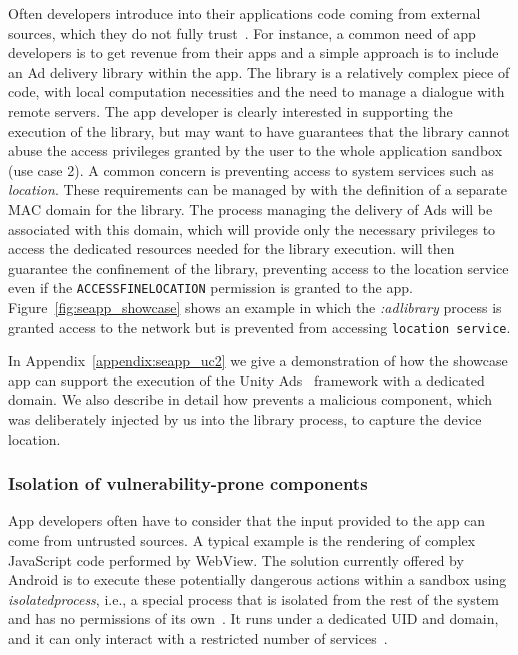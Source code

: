 Often developers introduce into their applications code coming from
external sources, which they do not fully trust~\cite{seapp_7958574,
  seapp_10.1145/2414456.2414498, seapp_demetriou2016free}.  For
instance, a common need of app developers is to get revenue from their
apps and a simple approach is to include an Ad delivery library within
the app.  The library is a relatively complex piece of code, with
local computation necessities and the need to manage a dialogue with
remote servers.  The app developer is clearly interested in supporting
the execution of the library, but may want to have guarantees that the
library cannot abuse the access privileges granted by the user to the
whole application sandbox (use case 2).  A common concern is
preventing access to system services such as {\em location}.  These
requirements can be managed by \seapp with the definition of a separate
MAC domain for the library.  The process managing the delivery of Ads
will be associated with this domain, which will provide only the
necessary privileges to access the dedicated resources needed for the
library execution.  \sel will then guarantee the confinement of the
library, preventing access to the location service even if the
\texttt{ACCESS\textunderscore FINE\textunderscore LOCATION} permission
is granted to the app.  Figure~\ref{fig:seapp_showcase} shows an
example in which the {\em :adlibrary} process is granted access to the
network but is prevented from accessing \texttt{location service}.

In Appendix~\ref{appendix:seapp_uc2} we give a demonstration of how
the showcase app can support the execution of the Unity
Ads~\cite{seapp_unityads} framework with a dedicated \sel domain. We
also describe in detail how \seapp prevents a malicious component, which
was deliberately injected by us into the library process, to capture
the device location.


\subsubsection{Isolation of vulnerability-prone
  components}\label{sect:seapp_int_comp_isolation}

App developers often have to consider that the input provided to the
app can come from untrusted sources.  A typical example is the
rendering of complex JavaScript code performed by WebView.  The
solution currently offered by Android is to execute these potentially
dangerous actions within a sandbox using {\em isolatedprocess}, i.e.,
a special process that is isolated from the rest of the system and has
no permissions of its own~\cite{seapp_isolatedprocess_perm}.  It runs
under a dedicated UID and \sel domain, and it can only interact with a
restricted number of services~\cite{seapp_isolated_app_te}.

